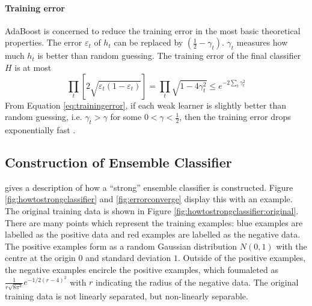 \paragraph{Training error}
AdaBoost is concerned to reduce the training error in the most basic theoretical properties. The error $\varepsilon_{t}$ of $h_{t}$ can be replaced by $(\frac{1}{2}-\gamma_{t})$. $\gamma_{t}$ measures how much $h_{t}$ is better than random guessing. The training error of the final classifier $H$ is at most
\begin{equation} \label{eq:trainingerror}
 \prod_{t}[2\sqrt{\varepsilon_{t}(1- \varepsilon_{t})}] = \prod_{t}\sqrt{1-4\gamma_{t}^{2}}  \leq e^{-2\sum_{t}\gamma_{t}^{2}}
\end{equation}
From \mbox{Equation} \ref{eq:trainingerror}, if each weak learner is slightly better than random guessing, i.e. $\gamma_{t}>\gamma$ for some $0<\gamma<\frac{1}{2}$, then the training error drops exponentially fast \cite{Freund1995}.

\subsection{Construction of Ensemble Classifier}
\label{sec:adaboostconstruction}
\cite{Matas2004} gives a description of how a ``strong'' ensemble classifier is constructed. \mbox{Figure} \ref{fig:howtostrongclassifier} and \ref{fig:errorconverge} display this with an example. The original training data is shown in \mbox{Figure} \ref{fig:howtostrongclassifier:original}. There are many points which represent the training examples: blue examples are labelled as the positive data and red examples are labelled as the negative data. The positive examples form as a random Gaussian distribution $N(0,1)$ with the centre at the origin $0$ and standard deviation $1$. Outside of the positive examples, the negative examples encircle the positive examples, which foumaleted as $\frac{1}{r\sqrt{8\pi^{3}}}e^{-1/2(r-4)^{2}}$ with $r$ indicating the radius of the negative data. The original training data is not linearly separated, but non-linearly separable.

